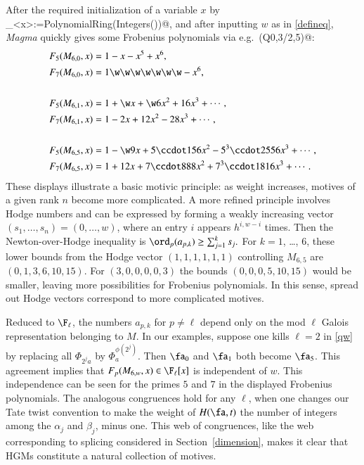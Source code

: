 \documentclass{notices}
\numberwithin{equation}{section}
\numberwithin{table}{section}
\numberwithin{figure}{section}
\begin{document}
{After the required initialization of a variable $x$ by \verb@_<x>:=PolynomialRing(Integers())@,
and after inputting \verb@Q@$w$ as in \eqref{defineq},
{\em Magma} quickly gives some Frobenius polynomials
via e.g.\ \verb@EulerFactor(Q0,3/2,5)@:
\begin{align*}
F_5(M_{6,0},x) & =  1-x-x^5+x^6, \\
F_7(M_{6,0},x) & =   1 \w\w\w\w\w\w\w-x^6, \\
& \\
F_5(M_{6,1},x) & = 1+\w x + \w 6 x^2 + 16 x^3+ \cdots, \\
F_7(M_{6,1},x) & =  1-2x + 12 x^2 - 28 x^3 + \cdots, \\
&\\
F_5(M_{6,5},x) & =  1-\w 9 x + 5 \ccdot 156 x^2 - 5^3 \ccdot 2556 x^3  + \cdots, \\
F_7(M_{6,5},x) & =  1+12 x + 7 \ccdot 888 x^2 + 7^3 \ccdot 1816  x^3 + \cdots.
\end{align*}
These displays illustrate a basic motivic principle: as weight 
increases, motives of a given rank $n$ become more
complicated.   A more refined principle involves Hodge numbers   
and can be expressed by forming 
a weakly increasing vector $(s_1,\dots,s_n)=(0,\dots,w)$, 
where an entry $i$ appears $h^{i,w-i}$ times.  Then the Newton-over-Hodge
inequality is   
$
\ord_p(a_{p,k}) \geq \sum_{j=1}^k s_j.
$
For $k=1$, \dots, $6$, these lower bounds from the Hodge
vector $(1,1,1,1,1,1)$ controlling $M_{6,5}$ are 
$(0,1,3,6,10,15)$.  For $(3,0,0,0,0,3)$ the 
bounds  $(0,0,0,5,10,15)$ would be smaller, 
leaving more possibilities for Frobenius polynomials.
In this sense, spread out Hodge vectors correspond to
more complicated motives.  

 Reduced to $\F_\ell$, the numbers
$a_{p,k}$ for $p \neq \ell$ depend only on the mod $\ell$ Galois 
representation belonging to $M$.  In our 
examples, suppose one kills $\ell = 2$ in \eqref{qw}
by replacing all $\Phi_{2^j a}$ by $\Phi_a^{\phi(2^j)}$.  
Then $\fa_0$ and $\fa_1$ both become $\fa_5$.  
This agreement implies that $F_p(M_{6,w},x) \in \F_\ell[x]$ is
independent of $w$.   This independence  can
be seen for the primes $5$ and $7$  in the displayed
Frobenius polynomials.  The analogous
congruences hold for any $\ell$, when
one changes our Tate twist convention
to make the weight of $H(\fa,t)$ the 
number of integers among the $\alpha_j$ and $\beta_j$, 
minus one.  This web of congruences, like the web corresponding
to splicing considered in Section~\ref{dimension}, makes it clear that 
HGMs constitute a natural collection of motives. 



}
\end{document}
